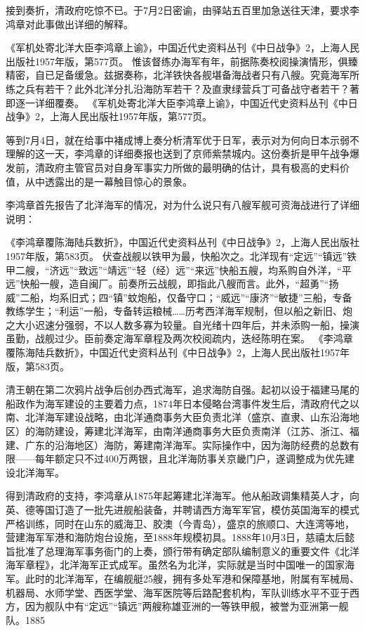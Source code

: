 \documentclass[12pt,UTF8]{ctexbook}
\begin{document}
接到奏折，清政府吃惊不已。于7月2日密谕，由驿站五百里加急送往天津，要求李鸿章对此事做出详细的解释。

《军机处寄北洋大臣李鸿章上谕》，中国近代史资料丛刊《中日战争》2，上海人民出版社1957年版，第577页。
惟该督练办海军有年，前据陈奏校阅操演情形，俱臻精密，自已足备缓急。兹据奏称，北洋铁快各舰堪备海战者只有八艘。究竟海军所练之兵有若干？此外北洋分扎沿海防军若干？及直隶绿营兵丁可备战守者若干？著即逐一详细覆奏。 《军机处寄北洋大臣李鸿章上谕》，中国近代史资料丛刊《中日战争》2，上海人民出版社1957年版，第577页。

等到7月4日，就在给事中褚成博上奏分析清军优于日军，表示对为何向日本示弱不理解的这一天，李鸿章的详细奏报也送到了京师紫禁城内。这份奏折是甲午战争爆发前，清政府主管官员对自身军事实力所做的最明确的估计，具有极高的史料价值，从中透露出的是一幕触目惊心的景象。

李鸿章首先报告了北洋海军的情况，对为什么说只有八艘军舰可资海战进行了详细说明：

《李鸿章覆陈海陆兵数折》，中国近代史资料丛刊《中日战争》2，上海人民出版社1957年版，第583页。
伏查战舰以铁甲为最，快船次之。北洋现有“定远”“镇远”铁甲二艘，“济远”“致远”“靖远”“轻（经）远”“来远”快船五艘，均系购自外洋，“平远”快船一艘，造自闽厂。前奏所云战舰，即指此八艘而言。此外，“超勇”“扬威”二船，均系旧式；四“镇”蚊炮船，仅备守口；“威远”“康济”“敏捷”三船，专备教练学生；“利运”一船，专备转运粮械……历考西洋海军规制，但以船之新旧、炮之大小迟速分强弱，不以人数多寡为较量。自光绪十四年后，并未添购一船，操演虽勤，战舰过少。臣前奏定海军章程及两次校阅疏内，迭经陈明在案。 《李鸿章覆陈海陆兵数折》，中国近代史资料丛刊《中日战争》2，上海人民出版社1957年版，第583页。

清王朝在第二次鸦片战争后创办西式海军，追求海防自强。起初以设于福建马尾的船政作为海军建设的主要着力点，1874年日本侵略台湾事件发生后，清政府代之以南、北洋海军建设战略，由北洋通商事务大臣负责北洋（盛京、直隶、山东沿海地区）的海防建设，筹建北洋海军，由南洋通商事务大臣负责南洋（江苏、浙江、福建、广东的沿海地区）海防，筹建南洋海军。实际操作中，因为海防经费的总数有限——每年额定只不过400万两银，且北洋海防事关京畿门户，遂调整成为优先建设北洋海军。

得到清政府的支持，李鸿章从1875年起筹建北洋海军。他从船政调集精英人才，向英、德等国订造了一批先进舰船装备，并聘请西方海军军官，模仿英国海军的模式严格训练，同时在山东的威海卫、胶澳（今青岛），盛京的旅顺口、大连湾等地，营建海军军港和海防炮台设施，至1888年规模初具。1888年10月3日，慈禧太后懿旨批准了总理海军事务衙门的上奏，颁行带有确定部队编制意义的重要文件《北洋海军章程》，北洋海军正式成军。虽然名为北洋，实际就是当时中国唯一的国家海军。此时的北洋海军，在编舰艇25艘，拥有多处军港和保障基地，附属有军械局、机器局、水师学堂、西医学堂、海军医院等后路配套机构，军队训练水平不亚于西方，因为舰队中有“定远”“镇远”两艘称雄亚洲的一等铁甲舰，被誉为亚洲第一舰队。1885
\end{document}
